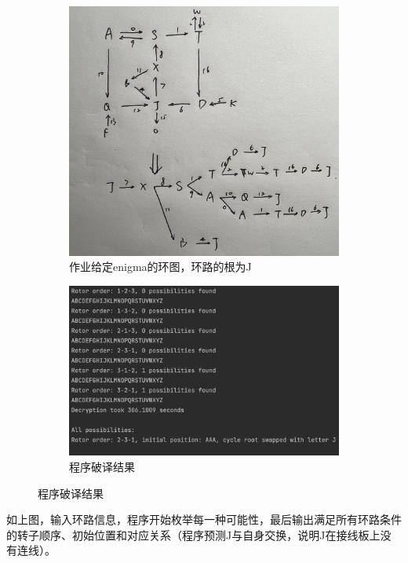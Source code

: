 \documentclass[a4paper,12pt]{article}
\begin{document}
	\noindent
	\begin{figure}
	\centering
		\begin{subfigure}{.4\textwidth}
			\centering
			\includegraphics[width=\linewidth]{turingring}
			\caption{作业给定enigma的环图，环路的根为J}
		\end{subfigure}
		\begin{subfigure}{.55\textwidth}
			\centering
			\includegraphics[width=0.9\linewidth]{turing}
			\caption{程序破译结果}
		\end{subfigure}
	\end{figure}

		如上图，输入环路信息，程序开始枚举每一种可能性，最后输出满足所有环路条件的转子顺序、初始位置和对应关系（程序预测J与自身交换，说明J在接线板上没有连线）。
	
\end{document}
